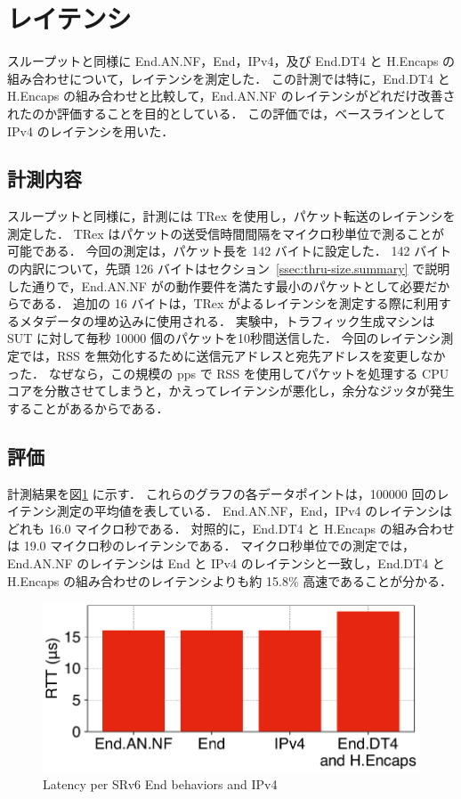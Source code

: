 \section{レイテンシ}
\label{sec:eval.rtt}
スループットと同様に End.AN.NF，End，IPv4，及び End.DT4 と H.Encaps の組み合わせについて，レイテンシを測定した．
この計測では特に，End.DT4 と H.Encaps の組み合わせと比較して，End.AN.NF のレイテンシがどれだけ改善されたのか評価することを目的としている．
この評価では，ベースラインとして IPv4 のレイテンシを用いた．

\subsection{計測内容}
\label{ssec:rtt.summary}
スループットと同様に，計測には TRex を使用し，パケット転送のレイテンシを測定した．
TRex はパケットの送受信時間間隔をマイクロ秒単位で測ることが可能である．
今回の測定は，パケット長を 142 バイトに設定した．
142 バイトの内訳について，先頭 126 バイトはセクション~\ref{ssec:thru-size.summary} で説明した通りで，End.AN.NF がの動作要件を満たす最小のパケットとして必要だからである．
追加の 16 バイトは，TRex がよるレイテンシを測定する際に利用するメタデータの埋め込みに使用される．
実験中，トラフィック生成マシンは SUT に対して毎秒 10000 個のパケットを10秒間送信した．
今回のレイテンシ測定では，RSS を無効化するために送信元アドレスと宛先アドレスを変更しなかった．
なぜなら，この規模の pps で RSS を使用してパケットを処理する CPU コアを分散させてしまうと，かえってレイテンシが悪化し，余分なジッタが発生することがあるからである．

\subsection{評価}
\label{ssec:rtt.eval}
計測結果を図\ref{fig:rtt} に示す．
これらのグラフの各データポイントは，100000 回のレイテンシ測定の平均値を表している．
End.AN.NF，End，IPv4 のレイテンシはどれも 16.0 マイクロ秒である．
対照的に，End.DT4 と H.Encaps の組み合わせは 19.0 マイクロ秒のレイテンシである．
マイクロ秒単位での測定では，End.AN.NF のレイテンシは End と IPv4 のレイテンシと一致し，End.DT4 と H.Encaps の組み合わせのレイテンシよりも約 15.8\% 高速であることが分かる．

\begin{figure}[t]
    \centering
    \includegraphics[width=0.95\linewidth]{img/latency.pdf}
    \caption{Latency per SRv6 End behaviors and IPv4}
    \label{fig:rtt}
\end{figure}